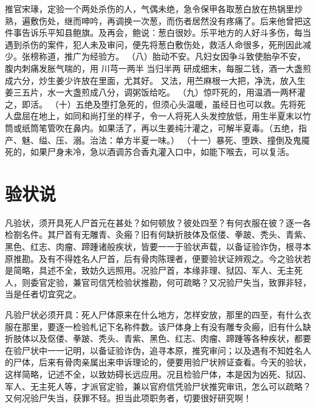 \documentclass[12pt,UTF8]{ctexbook}
\begin{document}
推官宋瑑，定验一个两处杀伤的人，气偶未绝，急令保甲各取葱白放在热锅里炒熟，遍敷伤处，继而呻吟，再调换一次葱，而伤者居然没有疼痛了。后来他曾把这件事告诉乐平知县鲍旗。及再会，鲍说：葱白很妙。乐平地方的人好斗多伤，每当遇到杀伤的案件，犯人未及审问，便先将葱白敷伤处，救活人命很多，死刑因此减少。张榜称道，推广为经验方。
（八）胎动不安。凡妇女因争斗致使胎孕不安，腹内刺痛发胀气喘的，用
川芎一两半 当归半两
研成细末，每服二钱，酒一大盏煎成六分，炒生姜少许放在里面，尤其好。
又法，用苎麻根一大把，净洗，放入生姜三五片，水一大盏煎成八分，调粥饭给吃。
（九）惊吓死的，用温酒一两杯灌之，即活。
（十）五绝及堕打急死的，但须心头温暖，虽经日也可以救。先将死人盘屈在地上，如同和尚打坐的样子，令一人将死人头发控放低，用生半夏末以竹筒或纸筒笔管吹在鼻内。如果活了，再以生姜纯汁灌之，可解半夏毒。（五绝，指产、魅、缢、压、溺。治法：单方半夏一味。）
（十一）暴死、堕跌、撞倒及鬼魇死的，如果尸身未冷，急以酒调苏合香丸灌入口中，如能下喉去，可以复活。


\chapter{验状说}

凡验状，须开具死人尸首元在甚处？如何顿放？彼处四至？有何衣服在彼？逐一各检劄名件。其尸首有无雕青、灸瘢？旧有何缺折肢体及伛偻、拳跛、秃头、青紫、黑色、红志、肉瘤、蹄踵诸般疾状，皆要一一于验状声载，以备证验诈伪，根寻本原推勘。及有不得姓名人尸首，后有骨肉陈理者，便要验状证辨观之。今之验状若是简略，具述不全，致妨久远照用。况验尸首，本缘非理、狱囚、军人、无主死人，则委官定验，兼官司信凭检验状推勘，何可疏略？又况验尸失当，致罪非轻，当是任者切宜究之。


凡验尸状必须开具：死人尸体原来在什么地方，怎样安放，那里的四至，有什么衣服在那里，要逐一检验札记下名称件数。该尸体身上有没有雕专灸瘢，旧有什么缺折肢体以及伛偻、拳跛、秃头、青紫、黑色、红志、肉瘤、蹄踵等各种疾状，都要在验尸状中一一记明，以备证验诈伪，追寻本原，推究审问；以及遇有不知姓名人的尸体，后来有骨肉亲属出来申诉理论的，便要用验尸状辨证查看。今天的验状，这样简略，记述不全，以致妨碍长远应用。况且检验尸体，本是因为凶死、狱囚、军人、无主死人等，才派官定验，兼以官府信凭验尸状推究审讯，怎么可以疏略？又何况验尸失当，获罪不轻。担当此项职务者，切要很好研究啊！


\backmatter
\end{document}
